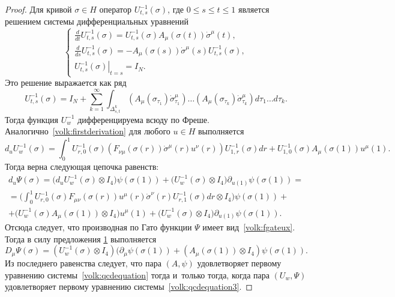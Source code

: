 \smallskip

\begin{proof}
Для кривой $\sigma\in H$  оператор $U^{-1}_{t,s}(\sigma)$, где $0\leq s\leq t \leq1$ является решением системы дифференциальных уравнений
 \begin{equation*}
\label{volk:form 2}
 \left\{
\begin{aligned}
\frac
{d}{dt}U^{-1}_{t,s}(\sigma)= U^{-1}_{t,s}(\sigma)A_{\mu}(\sigma(t))\dot{\sigma}^{\mu}(t), \\
\frac
d{ds}U^{-1}_{t,s}(\sigma)=-A_{\mu}(\sigma(s))\dot{\sigma}^{\mu}(s)U^{-1}_{t,s}(\sigma), \\
\left.U^{-1}_{t,s}(\sigma)\right|_{t=s}=I_N.
\end{aligned}
\right.
\end{equation*}
Это решение выражается как ряд
\begin{equation*}
 U^{-1}_{t,s}(\sigma)=I_N+
\sum_{k=1}^\infty\int _{\Delta_{s,t}^k} 
\left(A_\mu(\sigma_{\tau_1})\dot{\sigma}^\mu_{\tau_1}\right)\ldots\left(A_\mu(\sigma_{\tau_k})\dot{\sigma}^\mu_{\tau_k}\right)
d\tau_1\ldots d\tau_k
.
\end{equation*}
Тогда функция $U^{-1}_w$ дифференцируема всюду по Фреше. Аналогично~\eqref{volk:firstderivation}
для любого $u\in H$ выполняется
$$
d_u U_{w}^{-1}(\sigma)=
\int_0^1U^{-1}_{r, 0}(\sigma)(F_{\nu \mu}(\sigma(r))\dot{\sigma}^\mu(r)u^\nu(r))U^{-1}_{1,r}(\sigma) dr  +U^{-1}_{1, 0}(\sigma)A_\mu(\sigma(1))u^\mu(1).
$$
Тогда верна следующая цепочка равенств:
\begin{multline*}
d_u\Psi(\sigma)
=\bigl(d_uU_{w}^{-1}(\sigma)\otimes I_4\bigr)\psi(\sigma(1))+
\bigl(U_{w}^{-1}(\sigma)\otimes I_4\bigr)\partial_{u(1)}\psi(\sigma(1))=
\\=
\biggl(\int_0^1U^{-1}_{r, 0}(\sigma)
F_{\mu\nu}(\sigma(r))u^\mu(r)\dot{\sigma}^\nu(r)U_{r,1}^{-1}(\sigma)dr\otimes I_4\biggr)\psi(\sigma(1))+\\
+
\bigl(U_{w}^{-1}(\sigma)A_\mu(\sigma(1))\otimes I_4\bigr)u^\mu(1)+
\bigl(U_{w}^{-1}(\sigma)\otimes I_4\bigr)\partial_{u(1)}\psi(\sigma(1)).
\end{multline*}
Отсюда следует, что производная по Гато функции $\Psi$ имеет вид~\eqref{volk:fgateux}. 
Тогда в силу предложения \hyperlink{volk:pr1}{1} выполняется
$$
D_\mu\Psi(\sigma)=(U^{-1}_{w}(\sigma)\otimes I_4)(\partial_\mu\psi(\sigma(1))+(A_\mu(\sigma(1))\otimes I_4)\psi(\sigma(1)).
$$
Из последнего равенства следует, что пара $(A,\psi)$ удовлетворяет первому уравнению  системы~\eqref{volk:qcdequation} тогда и~только тогда, когда пара  $(U_{w},\Psi)$ удовлетворяет первому уравнению  системы~\eqref{volk:qcdequation3}.



\end{proof}

